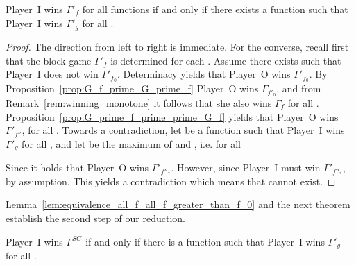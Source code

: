 \documentclass[fleqn,envcountsame]{LMCS}
\newcommand{\pI}{Player~I\xspace}
\newcommand{\pO}{Player~O\xspace}
\newcommand{\GSG}{\ensuremath{\Gamma^{SG}}\xspace}
\newcommand{\Gd}[1]{\ensuremath{\Gamma_{#1}}\xspace}
\newcommand{\Gp}[1]{\ensuremath{\Gamma'_{#1}}\xspace}
\newcommand{\ie}{i.e.\xspace}
\begin{document}
\begin{lem}\label{lem:equivalence_all_f_all_f_greater_than_f_0}
\pI wins \Gp{f} for all functions  if and only if there exists
a function  such that \pI wins \Gp{g} for
all .
\end{lem}
\begin{proof}
The direction from left to right is immediate. For the converse,
recall first that the block game \Gp{f} is determined for each .
Assume there exists  such that \pI does not win \Gp{f_0}.
Determinacy yields that \pO wins \Gp{f_0}.
By Proposition~\ref{prop:G_f_prime_G_prime_f} \pO wins \Gd{f'_0}, and
from Remark~\ref{rem:winning_monotone} it follows that she also wins \Gd{f} for
all . Proposition~\ref{prop:G_prime_f_prime_prime_G_f}
yields that \pO wins \Gp{f''}, for all . Towards
a contradiction, let  be a function such that \pI wins \Gp{g} for
all , and let  be the maximum of  and
, \ie for all 
  
Since  it holds that \pO wins
\Gp{f''_*}. However, since  \pI
must win \Gp{f''_*}, by assumption. This yields a contradiction which
means that  cannot exist.
\end{proof}

Lemma~\ref{lem:equivalence_all_f_all_f_greater_than_f_0} and the next
theorem establish the second step of our reduction.

\begin{thm}\label{thm:equivalence_all_f_greater_than_f_0_GSG}
\pI wins \GSG if and only if there is a function  such that
\pI wins \Gp{g} for all .
\end{thm}
\end{document}
